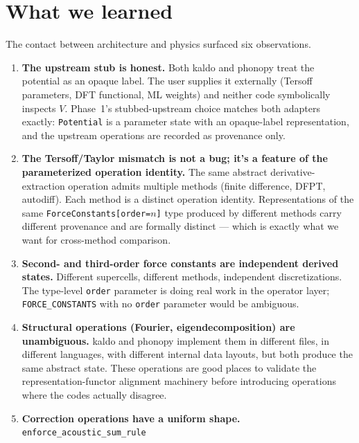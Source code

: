 \documentclass[11pt,a4paper]{article}
\begin{document}
\section{What we learned}

The contact between architecture and physics surfaced six observations.

\begin{enumerate}[leftmargin=2em]
  \item \textbf{The upstream stub is honest.} Both kaldo and phonopy treat the potential as an
        opaque label. The user supplies it externally (Tersoff parameters, DFT functional, ML
        weights) and neither code symbolically inspects $V$. Phase~1's stubbed-upstream choice
        matches both adapters exactly: \texttt{Potential} is a parameter state with an
        opaque-label representation, and the upstream operations are recorded as provenance
        only.
  \item \textbf{The Tersoff/Taylor mismatch is not a bug; it's a feature of the parameterized
        operation identity.} The same abstract derivative-extraction operation admits multiple
        methods (finite difference, DFPT, autodiff). Each method is a distinct operation
        identity. Representations of the same \texttt{ForceConstants[order=$n$]} type
        produced by different methods carry different provenance and are formally distinct ---
        which is exactly what we want for cross-method comparison.
  \item \textbf{Second- and third-order force constants are independent derived states.}
        Different supercells, different methods, independent discretizations. The type-level
        \texttt{order} parameter is doing real work in the operator layer; \texttt{FORCE\_CONSTANTS}
        with no \texttt{order} parameter would be ambiguous.
  \item \textbf{Structural operations (Fourier, eigendecomposition) are unambiguous.} kaldo and
        phonopy implement them in different files, in different languages, with different
        internal data layouts, but both produce the same abstract state. These operations are
        good places to validate the representation-functor alignment machinery before
        introducing operations where the codes actually disagree.
  \item \textbf{Correction operations have a uniform shape.} \texttt{enforce\_acoustic\_sum\_rule}

\end{enumerate}
\end{document}

